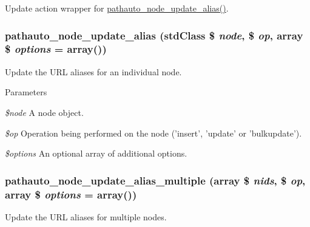 \label{pathauto_8module_abe86e5924ea06f972dd7c6de8b57c7f1}
Update action wrapper for \hyperlink{pathauto_8module_a7b5113607e03d0f1d12207d737545bcf}{pathauto\_\-node\_\-update\_\-alias()}. \hypertarget{pathauto_8module_a7b5113607e03d0f1d12207d737545bcf}{
\subsubsection[{pathauto\_\-node\_\-update\_\-alias}]{\setlength{\rightskip}{0pt plus 5cm}pathauto\_\-node\_\-update\_\-alias (stdClass \$ {\em node}, \/  \$ {\em op}, \/  array \$ {\em options} = {\ttfamily array()})}}
\label{pathauto_8module_a7b5113607e03d0f1d12207d737545bcf}
Update the URL aliases for an individual node.


\begin{DoxyParams}{Parameters}
\item[{\em \$node}]A node object. \item[{\em \$op}]Operation being performed on the node ('insert', 'update' or 'bulkupdate'). \item[{\em \$options}]An optional array of additional options. \end{DoxyParams}
\hypertarget{pathauto_8module_adc92cb455997bd4a2e6504b40951cdff}{
\subsubsection[{pathauto\_\-node\_\-update\_\-alias\_\-multiple}]{\setlength{\rightskip}{0pt plus 5cm}pathauto\_\-node\_\-update\_\-alias\_\-multiple (array \$ {\em nids}, \/  \$ {\em op}, \/  array \$ {\em options} = {\ttfamily array()})}}
\label{pathauto_8module_adc92cb455997bd4a2e6504b40951cdff}
Update the URL aliases for multiple nodes.


